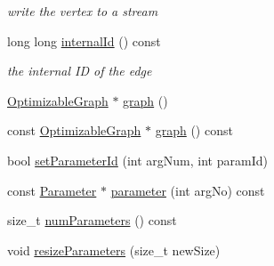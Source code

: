 \begin{DoxyCompactItemize}
\begin{DoxyCompactList}\small\item\em write the vertex to a stream \end{DoxyCompactList}\item 
long long \mbox{\hyperlink{classg2o_1_1_optimizable_graph_1_1_edge_a3c6e31c64d98db332e83166bfbd1d7ff}{internal\+Id}} () const
\begin{DoxyCompactList}\small\item\em the internal ID of the edge \end{DoxyCompactList}\item 
\mbox{\hyperlink{structg2o_1_1_optimizable_graph}{Optimizable\+Graph}} $\ast$ \mbox{\hyperlink{classg2o_1_1_optimizable_graph_1_1_edge_a3684190bf8e99f39f58ffadd0dfa6b05}{graph}} ()
\item 
const \mbox{\hyperlink{structg2o_1_1_optimizable_graph}{Optimizable\+Graph}} $\ast$ \mbox{\hyperlink{classg2o_1_1_optimizable_graph_1_1_edge_a06fdc51c984cf0050df376ca30c881e3}{graph}} () const
\item 
bool \mbox{\hyperlink{classg2o_1_1_optimizable_graph_1_1_edge_ae535735e71365a547fd1a11fae5378f6}{set\+Parameter\+Id}} (int arg\+Num, int param\+Id)
\item 
const \mbox{\hyperlink{classg2o_1_1_parameter}{Parameter}} $\ast$ \mbox{\hyperlink{classg2o_1_1_optimizable_graph_1_1_edge_a4a224a1d0d0bc5ef70765f57ae685d09}{parameter}} (int arg\+No) const
\item 
size\+\_\+t \mbox{\hyperlink{classg2o_1_1_optimizable_graph_1_1_edge_ae7da26fd36246411bc53ca008bc24fcf}{num\+Parameters}} () const
\item 
void \mbox{\hyperlink{classg2o_1_1_optimizable_graph_1_1_edge_ac978364c99e36c7fced59ecb383ba171}{resize\+Parameters}} (size\+\_\+t new\+Size)
\end{DoxyCompactItemize}
